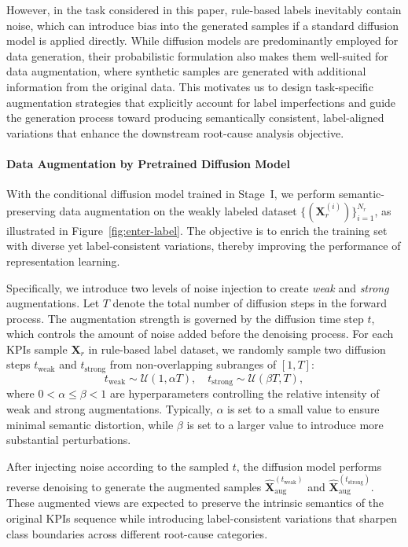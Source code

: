 \documentclass[lettersize,journal]{IEEEtran}
\begin{document}
However, in the task considered in this paper, rule-based labels inevitably contain noise, which can introduce bias into the generated samples if a standard diffusion model is applied directly. While diffusion models are predominantly employed for data generation, their probabilistic formulation also makes them well-suited for data augmentation, where synthetic samples are generated with additional information from the original data. This motivates us to design task-specific augmentation strategies that explicitly account for label imperfections and guide the generation process toward producing semantically consistent, label-aligned variations that enhance the downstream root-cause analysis objective.

\paragraph{Data Augmentation by Pretrained Diffusion Model}
With the conditional diffusion model trained in Stage~I, we perform semantic-preserving data augmentation on the weakly labeled dataset $\{(\mathbf{X}_r^{(i)})\}_{i=1}^{N_r}$, as illustrated in Figure~\ref{fig:enter-label}. 
The objective is to enrich the training set with diverse yet label-consistent variations, thereby improving the performance of representation learning.

Specifically, we introduce two levels of noise injection to create \emph{weak} and \emph{strong} augmentations. Let $T$ denote the total number of diffusion steps in the forward process. 
The augmentation strength is governed by the diffusion time step $t$, which controls the amount of noise added before the denoising process.
For each KPIs sample $\mathbf{X}_r$ in rule-based label dataset, we randomly sample two diffusion steps $t_{\mathrm{weak}}$ and $t_{\mathrm{strong}}$ from non-overlapping subranges of $[1, T]$:
\begin{equation}
t_{\mathrm{weak}} \sim \mathcal{U}(1, \alpha T), 
\quad 
t_{\mathrm{strong}} \sim \mathcal{U}(\beta T, T),
\label{for:alpha}
\end{equation}
where $0 < \alpha \leq \beta < 1$ are hyperparameters controlling the relative intensity of weak and strong augmentations. 
Typically, $\alpha$ is set to a small value to ensure minimal semantic distortion, while $\beta$ is set to a larger value to introduce more substantial perturbations.

After injecting noise according to the sampled $t$, the diffusion model performs reverse denoising to generate the augmented samples $\hat{\mathbf{X}}_{\mathrm{aug}}^{(t_{\mathrm{weak}})}$ and $\hat{\mathbf{X}}_{\mathrm{aug}}^{(t_{\mathrm{strong}})}$. 
These augmented views are expected to preserve the intrinsic semantics of the original KPIs sequence while introducing label-consistent variations that sharpen class boundaries across different root-cause categories.
\end{document}
